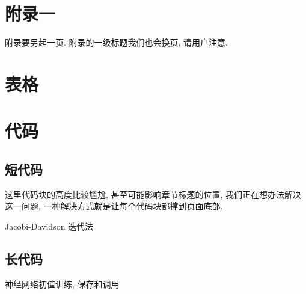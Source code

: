 
\section{附录一}

附录要另起一页. 附录的一级标题我们也会换页, 请用户注意.

\zhlipsum

\section{表格}


\section{代码}

\subsection{短代码}

这里代码块的高度比较尴尬, 甚至可能影响章节标题的位置, 我们正在想办法解决这一问题, 一种解决方式就是让每个代码块都撑到页面底部.

\begin{listing}
  \caption{Jacobi-Davidson 迭代法}\label{code:JD-iter}
\end{listing}

\subsection{长代码}

\begin{longlisting}
	\caption{神经网络初值训练, 保存和调用}\label{code:NN-init}
\end{longlisting}
